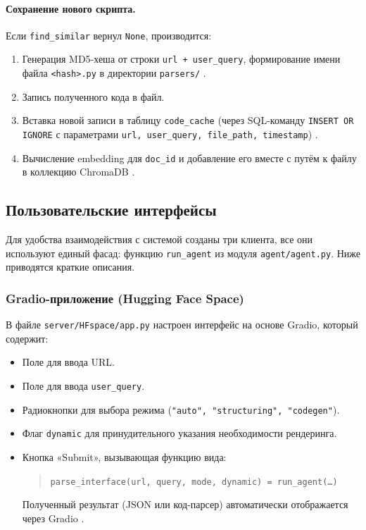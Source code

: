 \paragraph{Сохранение нового скрипта.}
Если \texttt{find\_similar} вернул \texttt{None}, производится:
\begin{enumerate}
    \item Генерация MD5-хеша от строки \texttt{url + user\_query}, формирование имени файла \texttt{<hash>.py} в директории \texttt{parsers/} \cite{Dong2022CacheLLM}.
    \item Запись полученного кода в файл.
    \item Вставка новой записи в таблицу \texttt{code\_cache} (через SQL-команду \texttt{INSERT OR IGNORE} с параметрами \texttt{url, user\_query, file\_path, timestamp}) \cite{SQLiteDocumentation}.
    \item Вычисление embedding для \texttt{doc\_id} и добавление его вместе с путём к файлу в коллекцию ChromaDB \cite{ChromaDBDocumentation}.
\end{enumerate}

\subsection{Пользовательские интерфейсы}
\label{subsec:solution5}

Для удобства взаимодействия с системой созданы три клиента, все они используют единый фасад: функцию \texttt{run\_agent} из модуля \texttt{agent/agent.py}. Ниже приводятся краткие описания.

\subsubsection{Gradio-приложение (Hugging Face Space)}

В файле \texttt{server/HFspace/app.py} настроен интерфейс на основе Gradio, который содержит:
\begin{itemize}
    \item Поле для ввода URL.
    \item Поле для ввода \texttt{user\_query}.
    \item Радиокнопки для выбора режима (\texttt{"auto", "structuring", "codegen"}).
    \item Флаг \texttt{dynamic} для принудительного указания необходимости рендеринга.
    \item Кнопка «Submit», вызывающая функцию вида:
    \begin{quote}
      \texttt{parse\_interface(url, query, mode, dynamic) = run\_agent(\dots)}
    \end{quote}
    Полученный результат (JSON или код-парсер) автоматически отображается через Gradio \cite{GradioDocumentation}.
\end{itemize}

